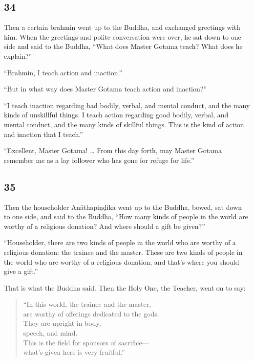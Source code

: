 \documentclass[12pt,openany]{book}%
\begin{document}
\subsection*{34 }

Then a certain brahmin went up to the Buddha, and exchanged greetings with him. When the greetings and polite conversation were over, he sat down to one side and said to the Buddha, “What does Master Gotama teach? What does he explain?” 

“Brahmin, I teach action and inaction.” 

“But in what way does Master Gotama teach action and inaction?” 

“I teach inaction regarding bad bodily, verbal, and mental conduct, and the many kinds of unskillful things. I teach action regarding good bodily, verbal, and mental conduct, and the many kinds of skillful things. This is the kind of action and inaction that I teach.” 

“Excellent, Master Gotama! … From this day forth, may Master Gotama remember me as a lay follower who has gone for refuge for life.” 

\subsection*{35 }

Then the householder \textsanskrit{Anāthapiṇḍika} went up to the Buddha, bowed, sat down to one side, and said to the Buddha, “How many kinds of people in the world are worthy of a religious donation? And where should a gift be given?” 

“Householder, there are two kinds of people in the world who are worthy of a religious donation: the trainee and the master. These are two kinds of people in the world who are worthy of a religious donation, and that’s where you should give a gift.” 

That is what the Buddha said. Then the Holy One, the Teacher, went on to say: 

\begin{verse}%
“In this world, the trainee and the master, \\
are worthy of offerings dedicated to the gods. \\
They are upright in body, \\
speech, and mind. \\
This is the field for sponsors of sacrifice—\\
what’s given here is very fruitful.” 

%
\end{verse}
\end{document}
